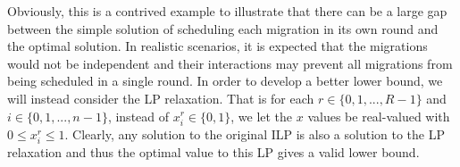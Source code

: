 \documentclass[conference]{IEEEtran}
\begin{document}
Obviously, this is a contrived example to illustrate that there can be a large gap between the simple solution of scheduling each migration in its own round and the optimal solution. In realistic scenarios, it is expected that the migrations would not be independent and their interactions may prevent all migrations from being scheduled in a single round. In order to develop a better lower bound, we will instead consider the LP relaxation. That is for each $r \in \{0, 1, ..., R - 1\}$ and $i \in \{0, 1, ..., n - 1\}$, instead of $x^{r}_{i} \in \{0, 1\}$, we let the $x$ values be real-valued with $0 \leq x^{r}_{i} \leq 1$. Clearly, any solution to the original ILP is also a solution to the LP relaxation and thus the optimal value to this LP gives a valid lower bound.




% 
% 


\end{document}

